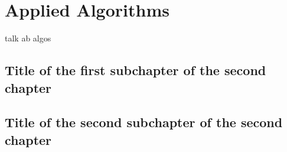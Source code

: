 \chapter{Applied Algorithms}
talk ab algos
\section{Title of the first subchapter of the second chapter}

\section{Title of the second subchapter of the second chapter}
